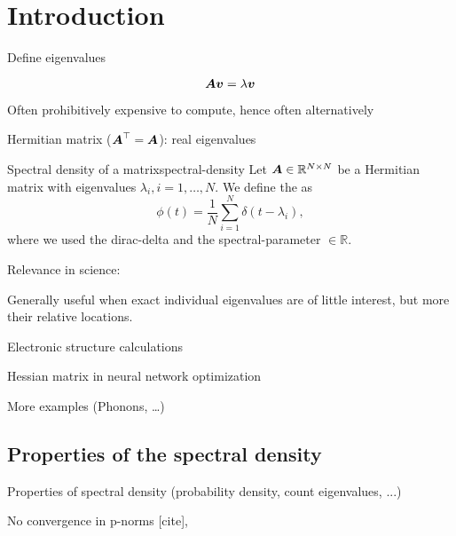 \chapter{Introduction}
\label{chp:1-introduction}

Define eigenvalues

\begin{equation}
    \boldsymbol{A} \boldsymbol{v} = \lambda \boldsymbol{v}
    \label{equ:1-introduction-eigenvalue}
\end{equation}

Often prohibitively expensive to compute, hence often alternatively

Hermitian matrix ($\boldsymbol{A}^{\top} = \boldsymbol{A}$): real eigenvalues 

\begin{definition}{Spectral density of a matrix}{spectral-density}
    Let $\boldsymbol{A} \in \mathbb{R}^{N \times N}$ be a Hermitian matrix with eigenvalues $\lambda_i, i=1, \dots, N$.
    We define the  as
    \begin{equation}
        \phi(t) = \frac{1}{N} \sum_{i=1}^{N} \delta(t - \lambda_i),
        \label{equ:1-introduction-def-spectral-density}
    \end{equation}
    where we used the \gls{dirac-delta} \cite[Chapter~15]{dirac1947quantum}
    and the \gls{spectral-parameter} $\in \mathbb{R}$.
\end{definition}

Relevance in science:

Generally useful when exact individual eigenvalues are of little interest, but
more their relative locations.

Electronic structure calculations \cite{ducastelle1970charge, haydock1972electronic, lin2017randomized}

Hessian matrix in neural network optimization \cite{ghorbani2019investigation}

More examples (Phonons, \dots)


\section{Properties of the spectral density}
\label{sec:1-introduction-properties}

Properties of spectral density (probability density, count eigenvalues, ...)

No convergence in p-norms [cite],

